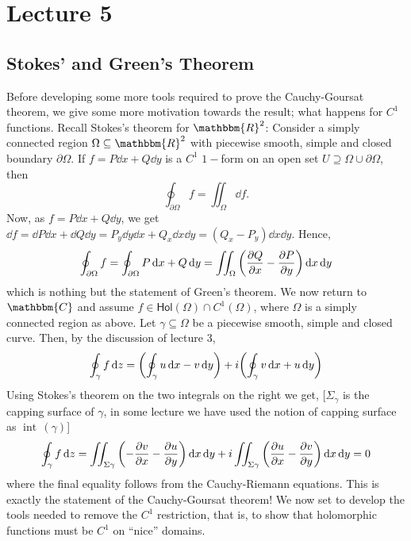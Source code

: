 \documentclass[../ComplexAnalysis_Notes.tex]{subfiles}
\begin{document}
\chapter*{Lecture 5} %
\setcounter{chapter}{5} %
\setcounter{section}{0}
\setcounter{equation}{0}
\setcounter{figure}{0}

\section{Stokes' and Green's Theorem}

Before developing some more tools required to prove the Cauchy-Goursat theorem, we give some more motivation towards the result; what happens for \( C^1 \) functions. Recall Stokes's theorem for \( \mathbbm{R}^2 \): Consider a simply connected region \( \Omega \subseteq \mathbbm{R}^2 \) with piecewise smooth, simple and closed boundary \( \partial \Omega \). If \( f = P \dd{x} + Q \dd{y} \) is a \( C^1 \) \( 1- \)form on an open set \( U \supseteq \Omega \cup \partial \Omega  \), then
\[
  \oint_{\partial \Omega} f = \iint_{\Omega}\dd{f}.
\]
Now, as \( f = P \dd{x} + Q \dd{y} \), we get \( \dd{f} = \dd{P} \dd{x} + \dd{Q} \dd{y} = P_y \dd{y}\dd{x} + Q_x \dd{x}\dd{y} = (Q_x-P_y)\dd{x}\dd{y} \). Hence,
\[
  \oint_{\partial \Omega} f = \oint_{\partial \Omega} P \dd{x} + Q \dd{y} = \iint_\Omega \qty(\pdv{Q}{x} - \pdv{P}{y}) \dd{x} \dd{y}
\]
which is nothing but the statement of Green's theorem. We now return to \( \mathbbm{C} \) and assume \( f \in \textsf{Hol}(\Omega) \cap C^1(\Omega) \), where \( \Omega \) is a simply connected region as above. Let \( \gamma \subseteq \Omega \) be a piecewise smooth, simple and closed curve. Then, by the discussion of lecture 3,
\[
  \oint_\gamma f \dd{z} = \qty(\oint_\gamma u \dd{x} - v \dd{y}) + i\qty(\oint_\gamma v \dd{x} + u \dd{y})
\]
Using Stokes's theorem on the two integrals on the right we get, [$\Sigma_{\gamma}$ is the capping surface of $\gamma$, in some lecture we have used the notion of capping surface as $\operatorname{int}\, (\gamma)$]
\[
  \oint_\gamma f \dd{z} = \iint_{\Sigma \gamma} \qty(-\pdv{v}{x}-\pdv{u}{y})\dd{x}\dd{y} + i \iint_{\Sigma \gamma} \qty(\pdv{u}{x}-\pdv{v}{y})\dd{x}\dd{y} = 0
\]
where the final equality follows from the Cauchy-Riemann equations. This is exactly the statement of the Cauchy-Goursat theorem! We now set to develop the tools needed to remove the \( C^1 \) restriction, that is, to show that holomorphic functions must be \( C^1 \) on ``nice'' domains.
\end{document}
